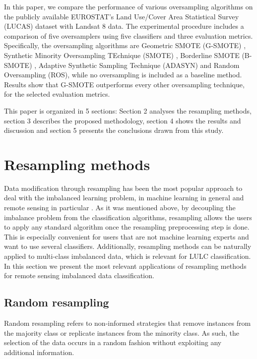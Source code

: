 \documentclass[remotesensing,article,submit,moreauthors,pdftex]{Definitions/mdpi}
\begin{document}
In this paper, we compare the performance of various oversampling algorithms on
the publicly available EUROSTAT's Land Use/Cover Area Statistical Survey
(LUCAS) dataset \cite{LUCAS2015C3} with Landsat 8 data. The experimental
procedure includes a comparison of five oversamplers using five classifiers and
three evaluation metrics. Specifically, the oversampling algorithms are
Geometric SMOTE (G-SMOTE) \cite{Douzas2019}, Synthetic Minority Oversampling
TEchnique (SMOTE) \cite{Chawla2002}, Borderline SMOTE (B-SMOTE) \cite{Han2005},
Adaptive Synthetic Sampling Technique (ADASYN) \cite{HaiboHe2008} and Random
Oversampling (ROS), while no oversampling is included as a baseline method.
Results show that G-SMOTE outperforms every other oversampling technique, for
the selected evaluation metrics.

This paper is organized in 5 sections: Section 2 analyses the resampling methods,
section 3 describes the proposed methodology, section 4 shows the results and
discussion and section 5 presents the conclusions drawn from this study.

\section{Resampling methods}

Data modification through resampling has been the most popular approach to deal
with the imbalanced learning problem, in machine learning in general and remote
sensing in particular \cite{Feng2019}. As it was mentioned above, by decoupling
the imbalance problem from the classification algorithms, resampling allows the
users to apply any standard algorithm once the resampling preprocessing step is
done. This is especially convenient for users that are not machine learning
experts and want to use several classifiers. Additionally, resampling methods
can be naturally applied to multi-class imbalanced data, which is relevant for
LULC classification. In this section we present the most relevant applications
of resampling methods for remote sensing imbalanced data classification.

\subsection{Random resampling}

Random resampling refers to non-informed strategies that remove instances from
the majority class or replicate instances from the minority class. As such, the
selection of the data occurs in a random fashion without exploiting any
additional information.
\end{document}
